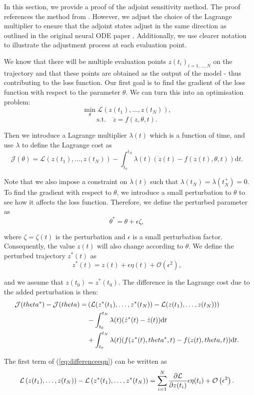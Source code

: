 \documentclass[a4paper,11pt,titlepage]{article}
\theoremstyle{definition}
\theoremstyle{plain}
\theoremstyle{remark}
\begin{document}
In this section, we provide a proof of the adjoint sensitivity method. The proof references the method from \cite{hu2024note}. However, we adjust the choice of the Lagrange multiplier to ensure that the adjoint states adjust in the same direction as outlined in the original neural ODE paper \cite{chen2018neural}. Additionally, we use clearer notation to illustrate the adjustment process at each evaluation point.

We know that there will be multiple evaluation points $z(t_i)_{i=1,\dots,N}$ on the trajectory and that these points are obtained as the output of the model - thus contributing to the loss function. Our first goal is to find the gradient of the loss function with respect to the parameter $\theta$. We can turn this into an optimisation problem:
$$
\min_{\theta} \mathcal{L}(z(t_1),\dots,z(t_{N})),
$$
$$
\mathrm{s.t.}\quad\dot{z}=f(z,\theta,t).
$$

Then we introduce a Lagrange multiplier $\lambda(t)$ which is a function of time, and use $\lambda$ to define the Lagrange cost as
$$
\mathcal{J}(\theta) = \mathcal{L}(z(t_1),\dots,z(t_{N}))-\int^{t_N}_{t_0}\lambda(t)(\dot{z}(t)-f(z(t),\theta,t))\mathrm{d}t.
$$

Note that we also impose a constraint on $\lambda(t)$ such that $\lambda(t_N)=\lambda(t_N^+)=0$. To find the gradient with respect to $\theta$, we introduce a small perturbation to $\theta$ to see how it affects the loss function. Therefore, we define the perturbed parameter as
$$
\theta^*=\theta+\epsilon\zeta,
$$

where $\zeta=\zeta(t)$ is the perturbation and $\epsilon$ is a small perturbation factor. Consequently, the value $z(t)$ will also change according to $\theta$. We define the perturbed trajectory $z^*(t)$ as 
$$z^*(t)=z(t)+\epsilon\eta(t)+\mathcal{O}(\epsilon^2),$$

and we assume that $z(t_0)=z^*(t_0)$. The difference in the Lagrange cost due to the added perturbation is then:
\begin{align}
\mathcal{J}(\theta^*)-\mathcal{J}(\theta)=&\left(\mathcal{L}(z^*(t_1),\dots,z^*(t_{N}))-\mathcal{L}(z(t_1),\dots,z(t_{N}))\right)\notag\\
&-\int^{t_N}_{t_0}\lambda(t)(\dot{z}^*(t)-\dot{z}(t))\mathrm{d}t\notag\\
&+\int^{t_N}_{t_0}\lambda(t)(f(z^*(t),\theta^*,t)-f(z(t),\theta,t))\mathrm{d}t.
\label{eq:differenceeqn}
\end{align}

The first term of (\ref{eq:differenceeqn}) can be written as
$$
\mathcal{L}\left(z(t_1),\dots,z(t_{N})\right)-\mathcal{L}\left(z^*(t_1),\dots,z^*(t_{N})\right) = \sum^N_{i=1}\frac{\partial \mathcal{L}}{\partial z(t_i)}\epsilon\eta(t_i)+\mathcal{O}\left(\epsilon^2\right).\notag
$$
\end{document}
